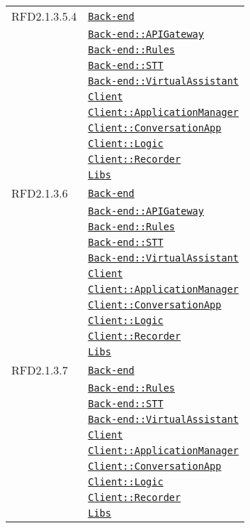 \begin{longtable}{|>{\centering}m{3cm}|m{10cm}<{\centering}|}
RFD2.1.3.5.4 & \hyperref[Back-end]{\texttt{Back-end}}\\
& \hyperref[Back-end::APIGateway]{\texttt{Back-end::APIGateway}}\\
& \hyperref[Back-end::Rules]{\texttt{Back-end::Rules}}\\
& \hyperref[Back-end::STT]{\texttt{Back-end::STT}}\\
& \hyperref[Back-end::VirtualAssistant]{\texttt{Back-end::VirtualAssistant}}\\
& \hyperref[Client]{\texttt{Client}}\\
& \hyperref[Client::ApplicationManager]{\texttt{Client::ApplicationManager}}\\
& \hyperref[Client::ConversationApp]{\texttt{Client::ConversationApp}}\\
& \hyperref[Client::Logic]{\texttt{Client::Logic}}\\
& \hyperref[Client::Recorder]{\texttt{Client::Recorder}}\\
& \hyperref[Libs]{\texttt{Libs}}\\ \hline

RFD2.1.3.6 & \hyperref[Back-end]{\texttt{Back-end}}\\
& \hyperref[Back-end::APIGateway]{\texttt{Back-end::APIGateway}}\\
& \hyperref[Back-end::Rules]{\texttt{Back-end::Rules}}\\
& \hyperref[Back-end::STT]{\texttt{Back-end::STT}}\\
& \hyperref[Back-end::VirtualAssistant]{\texttt{Back-end::VirtualAssistant}}\\
& \hyperref[Client]{\texttt{Client}}\\
& \hyperref[Client::ApplicationManager]{\texttt{Client::ApplicationManager}}\\
& \hyperref[Client::ConversationApp]{\texttt{Client::ConversationApp}}\\
& \hyperref[Client::Logic]{\texttt{Client::Logic}}\\
& \hyperref[Client::Recorder]{\texttt{Client::Recorder}}\\
& \hyperref[Libs]{\texttt{Libs}}\\ \hline

RFD2.1.3.7 & \hyperref[Back-end]{\texttt{Back-end}}\\
& \hyperref[Back-end::Rules]{\texttt{Back-end::Rules}}\\
& \hyperref[Back-end::STT]{\texttt{Back-end::STT}}\\
& \hyperref[Back-end::VirtualAssistant]{\texttt{Back-end::VirtualAssistant}}\\
& \hyperref[Client]{\texttt{Client}}\\
& \hyperref[Client::ApplicationManager]{\texttt{Client::ApplicationManager}}\\
& \hyperref[Client::ConversationApp]{\texttt{Client::ConversationApp}}\\
& \hyperref[Client::Logic]{\texttt{Client::Logic}}\\
& \hyperref[Client::Recorder]{\texttt{Client::Recorder}}\\
& \hyperref[Libs]{\texttt{Libs}}\\ \hline


\end{longtable}
